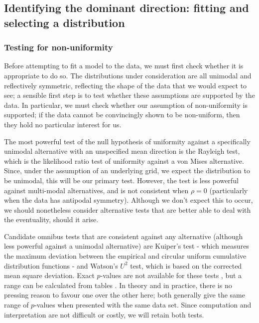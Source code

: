\documentclass[../../ArchStats.tex]{subfiles}
\begin{document}
\subsection{Identifying the dominant direction: fitting and selecting a distribution}

\subsubsection{Testing for non-uniformity}
Before attempting to fit a model to the data, we must first check whether it is appropriate to do so. The distributions under consideration are all unimodal and reflectively symmetric, reflecting the shape of the data that we would expect to see; a sensible first step is to test whether these assumptions are supported by the data. In particular, we must check whether our assumption of non-uniformity is supported; if the data cannot be convincingly shown to be non-uniform, then they hold no particular interest for us. 

The most powerful test of the null hypothesis of uniformity against a specifically unimodal alternative with an unspecified mean direction is the Rayleigh test, which is the likelihood ratio test of uniformity against a von Mises alternative. Since, under the assumption of an underlying grid, we expect the distribution to be unimodal, this will be our primary test. However, the test is less powerful against multi-modal alternatives, and is not consistent when $\rho = 0$ (particularly when the data has antipodal symmetry). Although we don't expect this to occur, we should nonetheless consider alternative tests that are better able to deal with the eventuality, should it arise.

Candidate omnibus tests that are consistent against any alternative (although less powerful against a unimodal alternative) are Kuiper's test - which measures the maximum deviation between the empirical and circular uniform cumulative distribution functions - and Watson's $U^2$ test, which is based on the corrected mean square deviation. Exact $p$-values are not available for these tests , but a range can be calculated from tables . In theory and in practice, there is no pressing reason to favour one over the other here; both generally give the same range of $p$-values when presented with the same data set. Since computation and interpretation are not difficult or costly, we will retain both tests.
\end{document}
